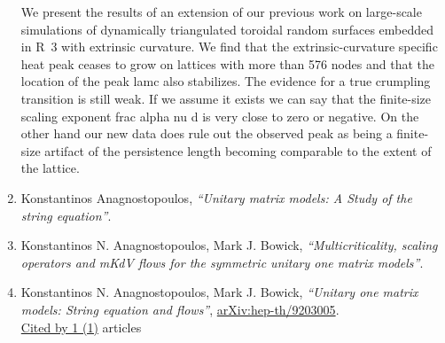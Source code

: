 \documentclass[a4paper,10pt]{article}
\begin{document}
\begin{enumerate}
We present the results of an extension of our previous work on large-scale simulations of dynamically triangulated toroidal random surfaces embedded in R~3 with extrinsic curvature. We find that the extrinsic-curvature specific heat peak ceases to grow on lattices with more than 576 nodes and that the location of the peak lamc also stabilizes. The evidence for a true crumpling transition is still weak. If we assume it exists we can say that the finite-size scaling exponent frac {alpha} {nu d} is very close to zero or negative. On the other hand our new data does rule out the observed peak as being a finite-size artifact of the persistence length becoming comparable to the extent of the lattice.
\item Konstantinos Anagnostopoulos, {\it ``Unitary matrix models: A Study of the string equation''}.


\item Konstantinos N. Anagnostopoulos, Mark J. Bowick, {\it ``Multicriticality, scaling operators and mKdV flows for the symmetric unitary one matrix models''}.


\item Konstantinos N. Anagnostopoulos, Mark J. Bowick, {\it ``Unitary one matrix models: String equation and flows''}, \href{https://arxiv.org/abs/hep-th/9203005}{arXiv:hep-th/9203005}.
\\\href{https://inspirehep.net/literature/?q=refersto%3Arecid%3A332805}{Cited by 1 (1)} articles


\end{enumerate}
\end{document}
